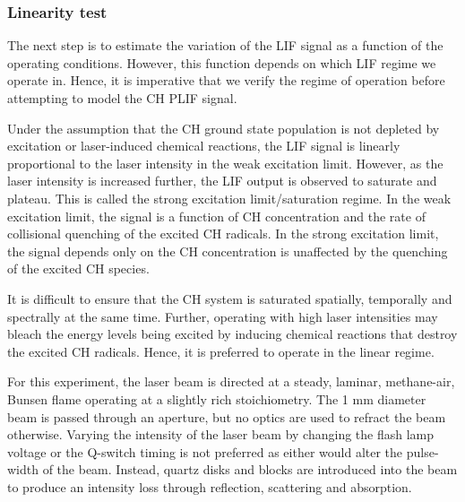 \subsubsection{Linearity test}


The next step is to estimate the variation of the LIF signal as a function of the operating conditions.
However, this function depends on which LIF regime we operate in.
Hence, it is imperative that we verify the regime of operation before attempting to model the CH PLIF signal.

Under the assumption that the CH ground state population is not depleted by excitation or laser-induced chemical reactions, the LIF signal is linearly proportional to the laser intensity in the weak excitation limit.
However, as the laser intensity is increased further, the LIF output is observed to saturate and plateau.
This is called the strong excitation limit/saturation regime.
In the weak excitation limit, the signal is a function of CH concentration and the rate of collisional quenching of the excited CH radicals.
In the strong excitation limit, the signal depends only on the CH concentration is unaffected by the quenching of the excited CH species.

It is difficult to ensure that the CH system is saturated spatially, temporally and spectrally at the same time.
Further, operating with high laser intensities may bleach the energy levels being excited by inducing chemical reactions that destroy the excited CH radicals.
Hence, it is preferred to operate in the linear regime.

For this experiment, the laser beam is directed at a steady, laminar, methane-air, Bunsen flame operating at a slightly rich stoichiometry.
The 1 mm diameter beam is passed through an aperture, but no optics are used to refract the beam otherwise.
Varying the intensity of the laser beam by changing the flash lamp voltage or the Q-switch timing is not preferred as either would alter the pulse-width of the beam.
Instead, quartz disks and blocks are introduced into the beam to produce an intensity loss through reflection, scattering and absorption.


